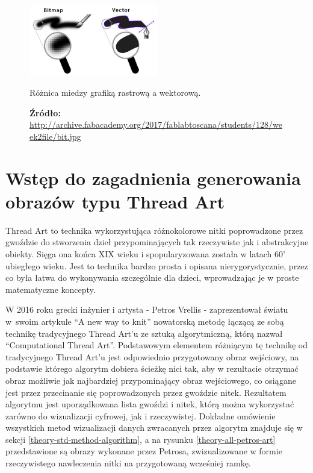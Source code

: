     \begin{figure}[htb]
        \centering
        \includegraphics[width=0.5\textwidth,keepaspectratio]{img/2-theory/raster-vs-vector.jpg}
        \caption[Różnica miedzy grafiką rastrową a wektorową.]{Różnica miedzy grafiką rastrową a wektorową.}
        \caption*{\footnotesize{\textbf{Źródło:} {\url{http://archive.fabacademy.org/2017/fablabtoscana/students/128/week2file/bit.jpg}}}}
        \label{theory-raster-vs-vector}
    \end{figure}
    
    \section{Wstęp do zagadnienia generowania obrazów typu Thread Art} \label{theory-intro}
    Thread Art to technika wykorzystująca różnokolorowe nitki poprowadzone przez gwoździe do stworzenia dzieł przypominających tak rzeczywiste jak i abstrakcyjne obiekty. Sięga ona końca XIX wieku i spopularyzowana została w latach 60' ubiegłego wieku. Jest to technika bardzo prosta i opisana nierygorystycznie, przez co była łatwa do wykonywania szczególnie dla dzieci, wprowadzając je w proste matematyczne koncepty. 
    
    W 2016 roku grecki inżynier i artysta - Petros Vrellis - zaprezentował światu w~swoim artykule ``A new way to knit'' \cite{new-way-to-knit} nowatorską metodę łączącą ze sobą technikę tradycyjnego Thread Art'u ze sztuką algorytmiczną, którą nazwał ``Computational Thread Art''. Podstawowym elementem różniącym tę technikę od tradycyjnego Thread Art'u jest odpowiednio przygotowany obraz wejściowy, na podstawie którego algorytm dobiera ścieżkę nici tak, aby w rezultacie otrzymać obraz możliwie jak najbardziej przypominający obraz wejściowego, co osiągane jest przez przecinanie się poprowadzonych przez gwoździe nitek. Rezultatem algorytmu jest uporządkowana lista gwoździ i nitek, którą można wykorzystać zarówno do wizualizacji cyfrowej, jak i rzeczywistej. Dokładne omówienie wszystkich metod wizualizacji danych zwracanych przez algorytm znajduje się w sekcji \ref{theory-std-method-algorithm}, a na rysunku \ref{theory-all-petros-art} przedstawione są obrazy wykonane przez Petrosa, zwizualizowane w formie rzeczywistego nawleczenia nitki na przygotowaną wcześniej ramkę. 
    \newpage
    
